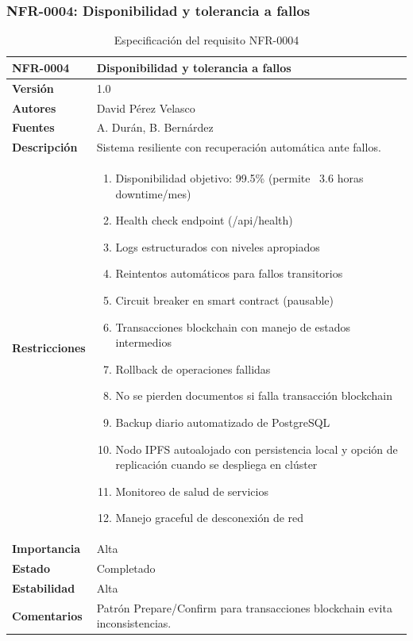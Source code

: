 \documentclass[11pt, a4paper]{article}
\begin{document}
\subsubsection{NFR-0004: Disponibilidad y tolerancia a fallos}

\begin{table}[H]
    \centering
    \small
    \begin{tabular}{|p{4cm}|p{10cm}|}
    \hline
    \textbf{NFR-0004} & Disponibilidad y tolerancia a fallos \\
    \hline
    \textbf{Versión} & 1.0 \\
    \hline
    \textbf{Autores} & David Pérez Velasco \\
    \hline
    \textbf{Fuentes} & A. Durán, B. Bernárdez \\
    \hline
    \textbf{Descripción} & Sistema resiliente con recuperación automática ante fallos. \\
    \hline
    \textbf{Restricciones} & 
    \begin{enumerate}
        \item Disponibilidad objetivo: 99.5\% (permite ~3.6 horas downtime/mes)
        \item Health check endpoint (/api/health)
        \item Logs estructurados con niveles apropiados
        \item Reintentos automáticos para fallos transitorios
        \item Circuit breaker en smart contract (pausable)
        \item Transacciones blockchain con manejo de estados intermedios
        \item Rollback de operaciones fallidas
        \item No se pierden documentos si falla transacción blockchain
        \item Backup diario automatizado de PostgreSQL
        \item Nodo IPFS autoalojado con persistencia local y opción de replicación cuando se despliega en clúster
        \item Monitoreo de salud de servicios
        \item Manejo graceful de desconexión de red
    \end{enumerate} \\
    \hline
    \textbf{Importancia} & Alta \\
    \hline
    \textbf{Estado} & Completado \\
    \hline
    \textbf{Estabilidad} & Alta \\
    \hline
    \textbf{Comentarios} & Patrón Prepare/Confirm para transacciones blockchain evita inconsistencias. \\
    \hline
    \end{tabular}
    \caption{Especificación del requisito NFR-0004}
\end{table}
\end{document}
